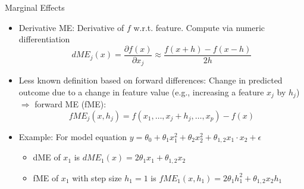 \documentclass[11pt,compress,t,notes=noshow, aspectratio=169, xcolor=table]{beamer}
\begin{document}




\begin{frame}{Marginal Effects}

\begin{itemize}
\item
Derivative ME: Derivative of $f$ w.r.t. feature. Compute via numeric differentiation
$$dME_j(x) = \frac{\partial f(x)}{\partial x_j} \approx \frac{f(x + h) - f(x - h)}{2h}$$
\item Less known definition based on forward differences: Change in predicted outcome due to a change in feature value (e.g., increasing a feature $x_j$ by $h_j$) $\Rightarrow$ forward ME (fME):
\begin{equation*}
fME_j(x, h_j) = f(x_1, \dots, x_j + h_j, \dots, x_p) - f(x)
\end{equation*}
\item Example: For model equation $y = \theta_0 + \theta_{1} x_1^2 + \theta_{2} x_2^2 + \theta_{1, 2} x_1 \cdot x_2 + \epsilon$
\begin{itemize}
\item dME of $x_1$ is $dME_1(x) = 2\theta_1 x_1 +  \theta_{1, 2} x_2$
\item fME of $x_1$ with step size $h_1 = 1$ is
$fME_1(x, h_1) = 2\theta_1 h_1^2 +  \theta_{1, 2} x_2 h_1$
\end{itemize}
\end{itemize}
\end{frame}
\end{document}
